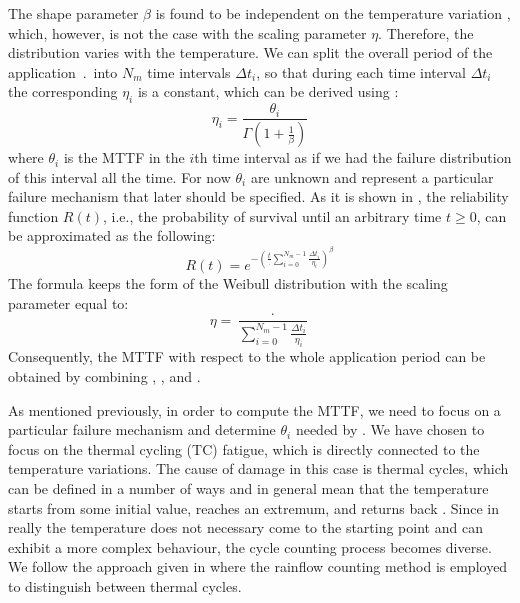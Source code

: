 The shape parameter $\beta$ is found to be independent on the temperature variation \cite{chang2006}, which, however, is not the case with the scaling parameter $\eta$. Therefore, the distribution varies with the temperature. We can split the overall period of the application $\period$ into $N_m$ time intervals $\Delta t_i$, so that during each time interval $\Delta t_i$ the corresponding $\eta_i$ is a constant, which can be derived using :
\begin{equation} \label{eq:eta-one}
  \eta_i = \frac{\theta_i}{\Gamma(1 + \frac{1}{\beta})}
\end{equation}
where $\theta_i$ is the MTTF in the $i$th time interval as if we had the failure distribution of this interval all the time. For now $\theta_i$ are unknown and represent a particular failure mechanism that later should be specified. As it is shown in \cite{xiang2010}, the reliability function $R(t)$, i.e., the probability of survival until an arbitrary time $t \geq 0$, can be approximated as the following:
\[
  R(t) = e^{-(\frac{t}{\period} \sum_{i=0}^{N_m - 1} \frac{\Delta t_i}{\eta_i})^\beta}
\]
The formula keeps the form of the Weibull distribution with the scaling parameter equal to:
\begin{equation} \label{eq:eta-many}
  \eta = \frac{\period}{\sum_{i=0}^{N_m - 1} \frac{\Delta t_i}{\eta_i}}
\end{equation}
Consequently, the MTTF with respect to the whole application period can be obtained by combining , , and .

As mentioned previously, in order to compute the MTTF, we need to focus on a particular failure mechanism and determine $\theta_i$ needed by . We have chosen to focus on the thermal cycling (TC) fatigue, which is directly connected to the temperature variations. The cause of damage in this case is thermal cycles, which can be defined in a number of ways \cite{ciappa2003} and in general mean that the temperature starts from some initial value, reaches an extremum, and returns back \cite{xiang2010}. Since in really the temperature does not necessary come to the starting point and can exhibit a more complex behaviour, the cycle counting process becomes diverse. We follow the approach given in \cite{xiang2010} where the rainflow counting method is employed to distinguish between thermal cycles.

